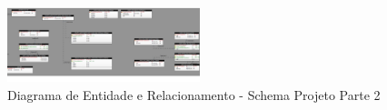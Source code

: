 \documentclass{acm_proc_article-sp}
\begin{document}
\begin{figure}[h]
\centering %
\includegraphics[width=0.5\textwidth]{DER_projeto_p2.jpg} %
\caption{Diagrama de Entidade e Relacionamento - Schema Projeto Parte 2}
\end{figure}
\end{document}
